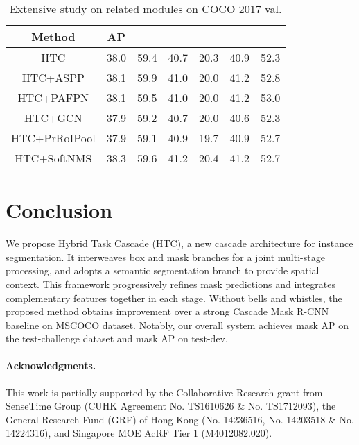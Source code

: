 \documentclass[10pt,twocolumn,letterpaper]{article}
\begin{document}
\begin{table}[htb]
	\centering
	\caption{Extensive study on related modules on COCO 2017 val.}
	\label{tab:extensive-study}
	\addtolength{\tabcolsep}{-2pt}
	\begin{tabular}{*{7}{c}}
		\toprule
		Method       & AP &  &  &  &  &  \\
		\midrule
		HTC          &38.0&       59.4       &       40.7       &      20.3       &      40.9       &      52.3       \\
		HTC+ASPP     &38.1&       59.9       &       41.0       &      20.0       &      41.2       &      52.8       \\
		HTC+PAFPN    &38.1&       59.5       &       41.0       &      20.0       &      41.2       &      53.0       \\
		HTC+GCN      &37.9&       59.2       &       40.7       &      20.0       &      40.6       &      52.3       \\
		HTC+PrRoIPool&37.9&       59.1       &       40.9       &      19.7       &      40.9       &      52.7       \\
		HTC+SoftNMS  &38.3&       59.6       &       41.2       &      20.4       &      41.2       &      52.7       \\
		\bottomrule
	\end{tabular}
	\vspace{-0.4cm}
\end{table} \section{Conclusion}

We propose Hybrid Task Cascade (HTC), a new cascade architecture for instance segmentation.
It interweaves box and mask branches for a joint multi-stage processing, and adopts a semantic segmentation branch to provide spatial context.
This framework progressively refines mask predictions and integrates complementary features together in each stage.
Without bells and whistles, the proposed method obtains
 improvement over a strong Cascade Mask R-CNN baseline on MSCOCO dataset.
Notably, our overall system achieves  mask AP on the
test-challenge dataset and  mask AP on test-dev.

\vspace{-12pt}
\paragraph{Acknowledgments.}
This work is partially supported by the Collaborative Research grant from SenseTime Group (CUHK Agreement No. TS1610626 \& No. TS1712093), the General Research Fund (GRF) of Hong Kong (No. 14236516, No. 14203518 \& No. 14224316), and Singapore MOE AcRF Tier 1 (M4012082.020).
 
{\small


}
\end{document}
